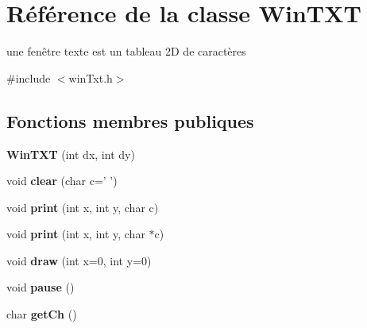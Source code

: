 \hypertarget{classWinTXT}{\section{Référence de la classe Win\+T\+X\+T}
\label{classWinTXT}
}


une fenêtre texte est un tableau 2\+D de caractères  




{\ttfamily \#include $<$win\+Txt.\+h$>$}

\subsection*{Fonctions membres publiques}
\begin{DoxyCompactItemize}
\item 
\hypertarget{classWinTXT_ad471ddd48d2a7c43acccd1204e419527}{{\bfseries Win\+T\+X\+T} (int dx, int dy)}\label{classWinTXT_ad471ddd48d2a7c43acccd1204e419527}

\item 
\hypertarget{classWinTXT_a1b4cb203533f78bed29498591631f436}{void {\bfseries clear} (char c=' ')}\label{classWinTXT_a1b4cb203533f78bed29498591631f436}

\item 
\hypertarget{classWinTXT_a407cce45e7f81546540f4f8a9b85ce45}{void {\bfseries print} (int x, int y, char c)}\label{classWinTXT_a407cce45e7f81546540f4f8a9b85ce45}

\item 
\hypertarget{classWinTXT_ad021d5fb9862b9ea7985f8cef50451e2}{void {\bfseries print} (int x, int y, char $\ast$c)}\label{classWinTXT_ad021d5fb9862b9ea7985f8cef50451e2}

\item 
\hypertarget{classWinTXT_af83a18827593465fc397983c97b4e886}{void {\bfseries draw} (int x=0, int y=0)}\label{classWinTXT_af83a18827593465fc397983c97b4e886}

\item 
\hypertarget{classWinTXT_a3e8793fd263bb51a62ec8a5e89904c49}{void {\bfseries pause} ()}\label{classWinTXT_a3e8793fd263bb51a62ec8a5e89904c49}

\item 
\hypertarget{classWinTXT_a418c66475403586ac57a80eceb409166}{char {\bfseries get\+Ch} ()}\label{classWinTXT_a418c66475403586ac57a80eceb409166}

\end{DoxyCompactItemize}

